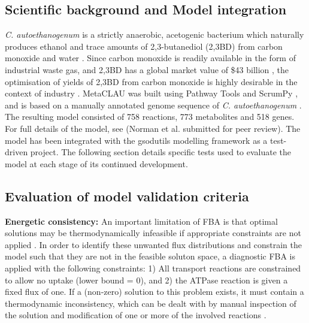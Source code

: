 \documentclass[journal=asbcd6,10pt]{achemso}
\begin{document}
\subsection{Scientific background and Model integration}

\textit{C. autoethanogenum} is a strictly anaerobic, acetogenic bacterium which naturally produces ethanol and trace amounts of 2,3-butanediol (2,3BD) from carbon monoxide and water \cite{abrini1994clostridium,schuchmann2014autotrophy,norman2018progress}. Since carbon monoxide is readily available in the form of industrial waste gas, and 2,3BD has a global market value of \$43 billion \cite{kopke201123butanediol}, the optimisation of yields of 2,3BD from carbon monoxide is highly desirable in the context of industry \cite{norman2018progress}.   
MetaCLAU was built using Pathway Tools \cite{karp2002pathway} and ScrumPy \cite{poolman2006scrumpy}, and is based on a manually annotated genome sequence of \textit{C. autoethanogenum} \cite{humphreys2015whole}. The resulting model consisted of 758 reactions, 773 metabolites and 518 genes. For full details of the model, see (Norman et al. submitted for peer review).
The model has been integrated with the gsodutils modelling framework as a test-driven project. The following section details specific tests used to evaluate the model at each stage of its continued development.

\subsection{Evaluation of model validation criteria}
\textbf{Energetic consistency:} 
An important limitation of FBA is that optimal solutions may be thermodynamically infeasible if appropriate constraints are not applied \cite{Fell1197rohtua}.
In order to identify these unwanted flux distributions and constrain the model such that they are not in the feasible soluton space, a diagnostic FBA is applied with the following constraints:
1) All transport reactions are constrained to allow no uptake (lower bound = 0), and 2) the ATPase reaction is given a fixed flux of one.
If a (non-zero) solution to this problem exists, it must contain a thermodynamic inconsistency, which can be dealt with by manual inspection of the solution and modification of one or more of the involved reactions \cite{Fell1197rohtua}.
 
\end{document}
